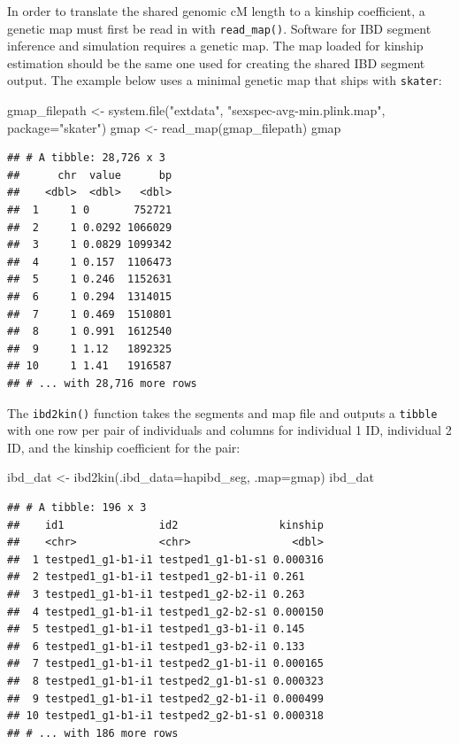 \documentclass[9pt,a4paper,]{extarticle}
\newenvironment{Shaded}{\begin{snugshade}}{\end{snugshade}}
\newcommand{\AttributeTok}[1]{\textcolor[rgb]{0.77,0.63,0.00}{#1}}
\newcommand{\FunctionTok}[1]{\textcolor[rgb]{0.00,0.00,0.00}{#1}}
\newcommand{\NormalTok}[1]{#1}
\newcommand{\OtherTok}[1]{\textcolor[rgb]{0.56,0.35,0.01}{#1}}
\newcommand{\StringTok}[1]{\textcolor[rgb]{0.31,0.60,0.02}{#1}}
\begin{document}
In order to translate the shared genomic cM length to a kinship coefficient, a genetic map must first be read in with \texttt{read\_map()}. Software for IBD segment inference and simulation requires a genetic map. The map loaded for kinship estimation should be the same one used for creating the shared IBD segment output. The example below uses a minimal genetic map that ships with \texttt{skater}:

\begin{Shaded}
\begin{Highlighting}[]
\NormalTok{gmap\_filepath }\OtherTok{\textless{}{-}} \FunctionTok{system.file}\NormalTok{(}\StringTok{"extdata"}\NormalTok{, }\StringTok{"sexspec{-}avg{-}min.plink.map"}\NormalTok{, }
                             \AttributeTok{package=}\StringTok{"skater"}\NormalTok{)}
\NormalTok{gmap }\OtherTok{\textless{}{-}} \FunctionTok{read\_map}\NormalTok{(gmap\_filepath)}
\NormalTok{gmap}
\end{Highlighting}
\end{Shaded}

\begin{verbatim}
## # A tibble: 28,726 x 3
##      chr  value      bp
##    <dbl>  <dbl>   <dbl>
##  1     1 0       752721
##  2     1 0.0292 1066029
##  3     1 0.0829 1099342
##  4     1 0.157  1106473
##  5     1 0.246  1152631
##  6     1 0.294  1314015
##  7     1 0.469  1510801
##  8     1 0.991  1612540
##  9     1 1.12   1892325
## 10     1 1.41   1916587
## # ... with 28,716 more rows
\end{verbatim}

The \texttt{ibd2kin()} function takes the segments and map file and outputs a \texttt{tibble} with one row per pair of individuals and columns for individual 1 ID, individual 2 ID, and the kinship coefficient for the pair:

\begin{Shaded}
\begin{Highlighting}[]
\NormalTok{ibd\_dat }\OtherTok{\textless{}{-}} \FunctionTok{ibd2kin}\NormalTok{(}\AttributeTok{.ibd\_data=}\NormalTok{hapibd\_seg, }\AttributeTok{.map=}\NormalTok{gmap)}
\NormalTok{ibd\_dat}
\end{Highlighting}
\end{Shaded}

\begin{verbatim}
## # A tibble: 196 x 3
##    id1               id2                kinship
##    <chr>             <chr>                <dbl>
##  1 testped1_g1-b1-i1 testped1_g1-b1-s1 0.000316
##  2 testped1_g1-b1-i1 testped1_g2-b1-i1 0.261   
##  3 testped1_g1-b1-i1 testped1_g2-b2-i1 0.263   
##  4 testped1_g1-b1-i1 testped1_g2-b2-s1 0.000150
##  5 testped1_g1-b1-i1 testped1_g3-b1-i1 0.145   
##  6 testped1_g1-b1-i1 testped1_g3-b2-i1 0.133   
##  7 testped1_g1-b1-i1 testped2_g1-b1-i1 0.000165
##  8 testped1_g1-b1-i1 testped2_g1-b1-s1 0.000323
##  9 testped1_g1-b1-i1 testped2_g2-b1-i1 0.000499
## 10 testped1_g1-b1-i1 testped2_g2-b1-s1 0.000318
## # ... with 186 more rows
\end{verbatim}
\end{document}
